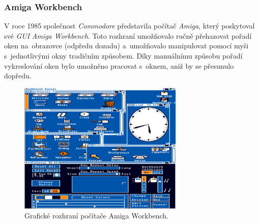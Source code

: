 \documentclass[11pt,twoside,a4paper]{book}
\begin{document}
\subsubsection{Amiga Workbench}
V roce 1985 společnost \textit{Commodore} představila počítač \textit{Amiga}, který poskytoval své \textit{GUI} \textit{Amiga Workbench}. Toto rozhraní umožňovalo ručně přehazovat pořadí oken na~obrazovce (odpředu dozadu) a~umožňovalo manipulovat pomocí myši s~jednotlivými okny tradičním způsobem. Díky manuálnímu způsobu pořadí vykreslování oken bylo umožněno pracovat s~oknem, aniž by se přesunulo dopředu.
\begin{figure}[!ht]
\begin{center}
  \includegraphics[width=0.7\textwidth]{amiga}
\caption{{\label{fig:amigaGUI}}Grafické rozhraní počítače Amiga Workbench.}
\end{center}
\end{figure}
\end{document}
